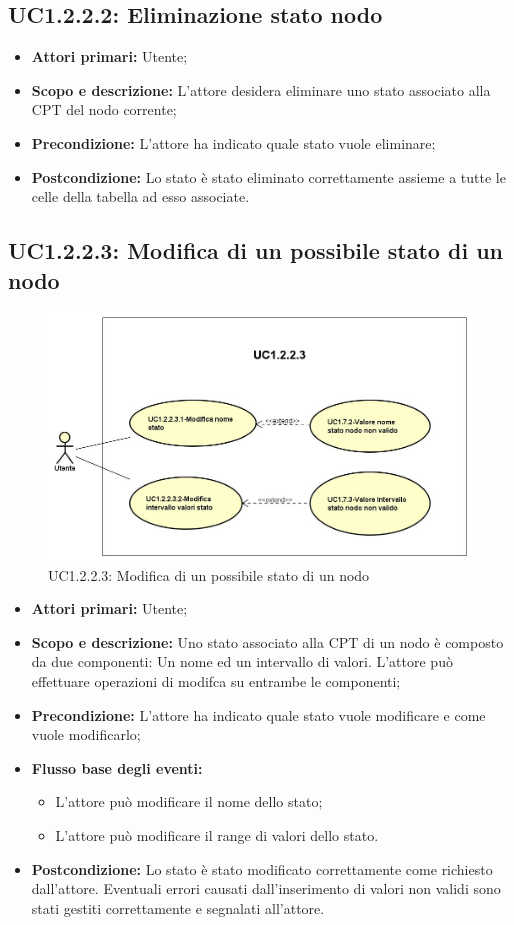 \subsection{UC1.2.2.2: Eliminazione stato nodo} 
\begin{itemize} 
	\item{\textbf{Attori primari:} Utente;} 
	\item{\textbf{Scopo e descrizione:} L'attore desidera eliminare uno stato associato alla CPT del nodo corrente;} 
	\item{\textbf{Precondizione:} L'attore ha indicato quale stato vuole eliminare;} 
	\item{\textbf{Postcondizione:} Lo stato è stato eliminato correttamente assieme a tutte le celle della tabella ad esso associate.} 
\end{itemize} 
\subsection{UC1.2.2.3: Modifica di un possibile stato di un nodo} 
\begin{figure} [H]
	\centering
	\includegraphics[scale=0.45]{Img/UC1-2-2-3} 
	\caption{UC1.2.2.3: Modifica di un possibile stato di un nodo} \label{} 
\end{figure} 
\begin{itemize} 
	\item{\textbf{Attori primari:} Utente;} 
	\item{\textbf{Scopo e descrizione:} Uno stato associato alla CPT di un nodo è composto da due componenti: Un nome ed un intervallo di valori. L'attore può effettuare operazioni di modifca su entrambe le componenti;} 
	\item{\textbf{Precondizione:} L'attore ha indicato quale stato vuole modificare e come vuole modificarlo;} 
	\item{\textbf{Flusso base degli eventi:} 
		\begin{itemize} 
			\item{L'attore può modificare il nome dello stato;} 
			\item{L'attore può modificare il range di valori dello stato.} 
		\end{itemize} 			
	} 
	\item{\textbf{Postcondizione:} Lo stato è stato modificato correttamente come richiesto dall'attore. Eventuali errori causati dall'inserimento di valori non validi sono stati gestiti correttamente e segnalati all'attore.} 
\end{itemize} 
